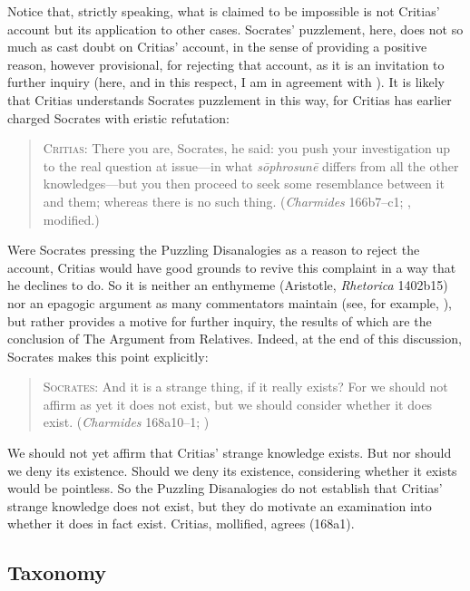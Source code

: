 Notice that, strictly speaking, what is claimed to be impossible is not Critias' account but its application to other cases. Socrates' puzzlement, here, does not so much as cast doubt on Critias' account, in the sense of providing a positive reason, however provisional, for rejecting that account, as it is an invitation to further inquiry (here, and in this respect, I am in agreement with \citealt{Politis:2008nv}). It is likely that Critias understands Socrates puzzlement in this way, for Critias has earlier charged Socrates with eristic refutation:
\begin{quote}
	\textsc{Critias}: There you are, Socrates, he said: you push your investigation up to the real question at issue—in what \emph{sōphrosunē} differs from all the other knowledges—but you then proceed to seek some resemblance between it and them; whereas there is no such thing. (\emph{Charmides} 166b7–c1; \citealt[53]{Lamb:1927qw}, modified.)
\end{quote}	
Were Socrates pressing the Puzzling Disanalogies as a reason to reject the account, Critias would have good grounds to revive this complaint in a way that he declines to do. So it is neither an enthymeme (Aristotle, \emph{Rhetorica} 1402b15) nor an epagogic argument as many commentators maintain (see, for example, \citealt[41]{Robinson:1941yb}), but rather provides a motive for further inquiry, the results of which are the conclusion of The Argument from Relatives. Indeed, at the end of this discussion, Socrates makes this point explicitly:
\begin{quote}
	\textsc{Socrates}: And it is a strange thing, if it really exists? For we should not affirm as yet it does not exist, but we should consider whether it does exist. (\emph{Charmides} 168a10–1; \citealt[61]{Lamb:1927qw})
\end{quote}
We should not yet affirm that Critias' strange knowledge exists. But nor should we deny its existence. Should we deny its existence, considering whether it exists would be pointless. So the Puzzling Disanalogies do not establish that Critias' strange knowledge does not exist, but they do motivate an examination into whether it does in fact exist. Critias, mollified, agrees (168a1).

\subsection{Taxonomy} %
\label{sub:taxonomy}

